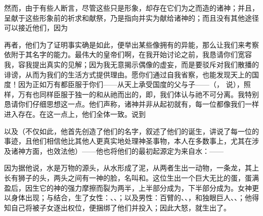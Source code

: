然而，由于有些人断言，尽管这些只是形象，却存在它们为之而造的诸神；并且，呈献于这些形象前的祈求和献祭，乃是指向并实为献给诸神的；而且没有其他途径可以接近他们，因为\par

\par

再者，他们为了证明事实确是如此，便举出某些像拥有的异能，那么让我们来考察依附于其名字的能力。最伟大的皇帝们啊，在我开始讨论之前，我恳请你们宽容我，容我提出真实的见解；因为我无意揭示偶像的虚妄，而是要驳斥对我们散播的诽谤，从而为我们的生活方式提供理由。愿你们通过自我省察，也能发现天上的国度！因为正如万有都臣服于你们——从天上承受国度的父与子——（， 说），照样，万有也同样臣服于独一的和从祂而出的，即，我们体认与祂不可分离。我特别恳请你们仔细思想这一点。他们声称，诸神并非从起初就有，每一位都像我们一样进入存在。在这一点上，他们全体一致。说到\par

\par

以及（不仅如此，他首先创造了他们的名字，叙述了他们的诞生，讲说了每一位的事迹，且他们相信他比其他人更真实地处理神圣事物，本人在多数事上，尤其在涉及诸神方面，也效法他）——他也将他们的最初起源定为来自水：——\par

\par

因为据他说，水是万物的源头，从水形成了泥，从两者生出一动物，一条龙，其上长有狮子的头，两头之间有一神的脸，名叫和。这位生出一个巨大无比的蛋，蛋满盈后，因生它的神的强力摩擦而裂为两半，上半部分成为，下半部分成为。女神更以身体出现；与结合，生了女性：、、；以及男性：百臂的、、，和独眼巨人、、；他得知自己将被子女逐出权位，便捆绑了他们并投入；因此大怒，就生出了。\par

